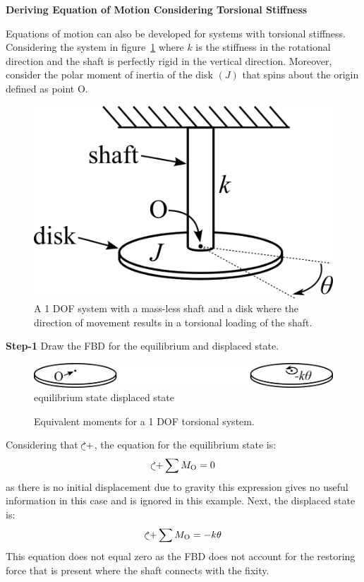 \documentclass[12pt,letter]{article}
\begin{document}
		\begin{example}	
			\textbf{Deriving Equation of Motion Considering Torsional Stiffness}

			\noindent Equations of motion can also be developed for systems with torsional stiffness. Considering the system in figure~\ref{fig:torsional_stiffness} where $k$ is the stiffness in the rotational direction and the shaft is perfectly rigid in the vertical direction. Moreover, consider the polar moment of inertia of the disk $(J)$ that spins about the origin defined as point O.
			\begin{figure}[H]
				\centering
				\includegraphics[]{../figures/torsional_stiffness}
				\caption{A 1 DOF system with a mass-less shaft and a disk where the direction of movement results in a torsional loading of the shaft.}
				\label{fig:torsional_stiffness}
			\end{figure}	
	
			\noindent \textbf{Step-1}
			Draw the FBD for the equilibrium and displaced state.  
			\begin{figure}[H]
				\centering
				\includegraphics[]{../figures/torsional_stiffness_FBD}\\\vspace{0.1cm}
				equilibrium state \hspace{3.6cm} displaced state
				\caption{Equivalent moments for a 1 DOF torsional system.}
			\end{figure}		
			\noindent Considering that $\curveplusclock$, the equation for the equilibrium state is:
			\begin{equation}
				\curveplusclock \sum M_\text{O} =  0
			\end{equation}
			as there is no initial displacement due to gravity this expression gives no useful information in this case and is ignored in this example. Next, the displaced state is:
			\begin{equation}
				\curveplusclock \sum M_\text{O} =  -k \theta
			\end{equation}	
			This equation does not equal zero as the FBD does not account for the restoring force that is present where the shaft connects with the fixity.	


\end{example}
\end{document}
